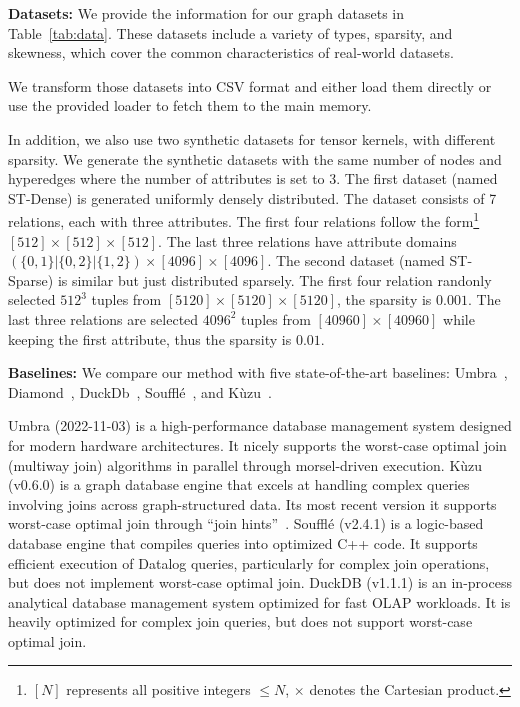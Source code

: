 \noindent\textbf{Datasets:} We provide the information for our graph datasets in Table~\ref{tab:data}. These datasets include a variety of types, sparsity, and skewness, which cover the common characteristics of real-world datasets.

We transform those datasets into CSV format and either load them directly or use the provided loader to fetch them to the main memory. 

In addition, we also use two synthetic datasets for tensor kernels, with different sparsity. We generate the synthetic datasets with the same number of nodes and hyperedges where the number of attributes is set to 3. The first dataset (named ST-Dense) is generated uniformly densely distributed. The dataset consists of 7 relations, each with three attributes. The first four relations follow the form\footnote{$[N]$ represents all positive integers $\leq N$, $\times$ denotes the Cartesian product.} $[512] \times [512] \times [512]$. The last three relations have attribute domains $(\{0, 1\} | \{0, 2\} | \{1, 2\}) \times [4096] \times [4096]$. The second dataset (named ST-Sparse) is similar but just distributed sparsely. The first four relation randonly selected $512^3$ tuples from $[5120] \times [5120] \times [5120]$, the sparsity is $0.001$. The last three relations are selected $4096^2$ tuples from $[40960] \times [40960]$ while keeping the first attribute, thus the sparsity is $0.01$.

\addvspace{\smallskipamount}
\noindent\textbf{Baselines:} We compare our method with five state-of-the-art baselines: Umbra~\cite{DBLP:journals/pvldb/FreitagBSKN20}, Diamond~\cite{DBLP:journals/pvldb/BirlerKN24}, DuckDb~\cite{DBLP:conf/cidr/RaasveldtM20}, Soufflé~\cite{DBLP:conf/lopstr/ArchHZSS22}, and Kùzu~\cite{DBLP:conf/cidr/JinFCLS23}. 

Umbra (2022-11-03) is a high-performance database management system designed for modern hardware architectures. It nicely supports the worst-case optimal join (multiway join) algorithms in parallel through morsel-driven execution.
Kùzu (v0.6.0) is a graph database engine that excels at handling
complex queries involving joins across graph-structured data. Its most
recent version it supports  worst-case optimal join through ``join hints''~\cite{kuzujoinhint}.
Soufflé (v2.4.1) is a logic-based database engine that compiles queries into optimized C++ code. It supports efficient execution of Datalog queries, particularly for complex join operations, but does not implement worst-case optimal join.
DuckDB (v1.1.1) is an in-process analytical database management system optimized for fast OLAP workloads. It is heavily optimized for complex join queries, but does not support worst-case optimal join.

